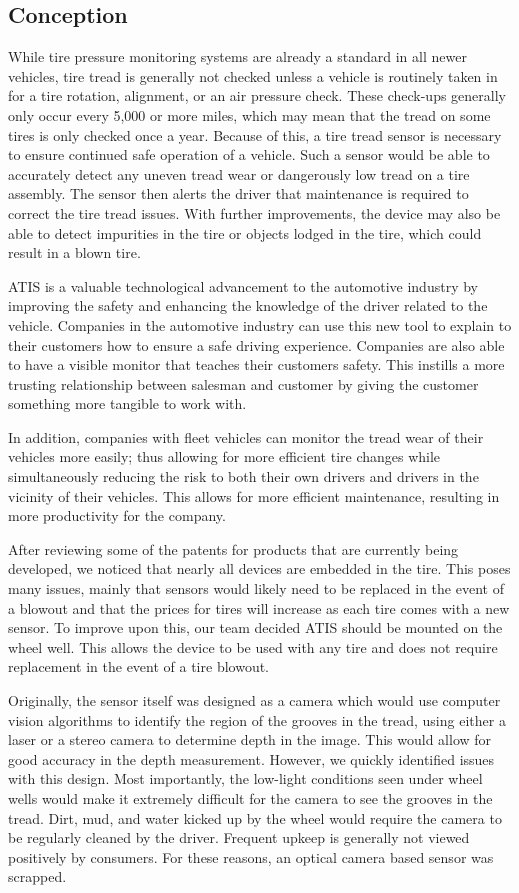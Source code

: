\documentclass[11pt]{IEEEtran}
\begin{document}
		\subsection{Conception}
			While tire pressure monitoring systems are already a standard in all newer vehicles, tire tread is generally not checked unless a vehicle is routinely taken in for a tire rotation, alignment, or an air pressure check. These check-ups generally only occur every 5,000 or more miles, which may mean that the tread on some tires is only checked once a year. Because of this, a tire tread sensor is necessary to ensure continued safe operation of a vehicle. Such a sensor would be able to accurately detect any uneven tread wear or dangerously low tread on a tire assembly. The sensor then alerts the driver that maintenance is required to correct the tire tread issues. With further improvements, the device may also be able to detect impurities in the tire or objects lodged in the tire, which could result in a blown tire.

			ATIS is a valuable technological advancement to the automotive industry by improving the safety and enhancing the knowledge of the driver related to the vehicle. Companies in the automotive industry can use this new tool to explain to their customers how to ensure a safe driving experience. Companies are also able to have a visible monitor that teaches their customers safety. This instills a more trusting relationship between salesman and customer by giving the customer something more tangible to work with.

			In addition, companies with fleet vehicles can monitor the tread wear of their vehicles more easily; thus allowing for more efficient tire changes while simultaneously reducing the risk to both their own drivers and drivers in the vicinity of their vehicles. This allows for more efficient maintenance, resulting in more productivity for the company. 

			After reviewing some of the patents for products that are currently being developed, we noticed that nearly all devices are embedded in the tire. This poses many issues, mainly that sensors would likely need to be replaced in the event of a blowout and that the prices for tires will increase as each tire comes with a new sensor. To improve upon this, our team decided ATIS should be mounted on the wheel well. This allows the device to be used with any tire and does not require replacement in the event of a tire blowout.

			Originally, the sensor itself was designed as a camera which would use computer vision algorithms to identify the region of the grooves in the tread, using either a laser or a stereo camera to determine depth in the image. This would allow for good accuracy in the depth measurement. However, we quickly identified issues with this design. Most importantly, the low-light conditions seen under wheel wells would make it extremely difficult for the camera to see the grooves in the tread. Dirt, mud, and water kicked up by the wheel would require the camera to be regularly cleaned by the driver. Frequent upkeep is generally not viewed positively by consumers. For these reasons, an optical camera based sensor was scrapped.
\end{document}
